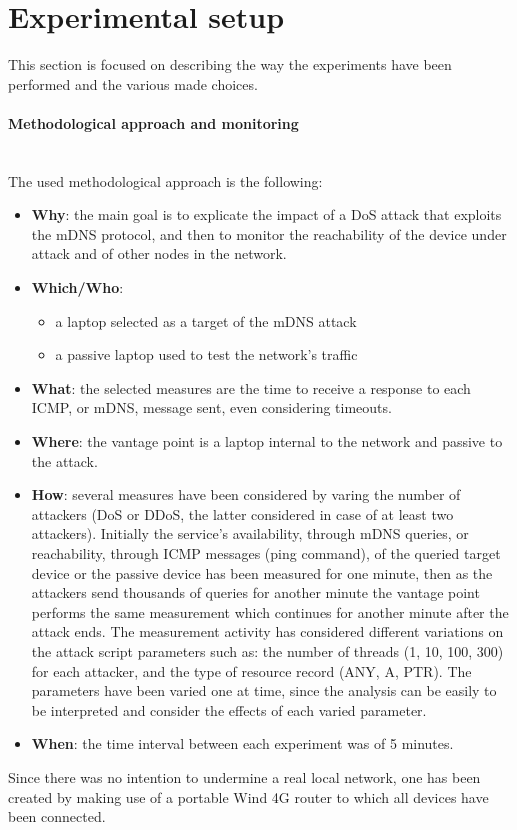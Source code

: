 \documentclass[fleqn, 11pt]{SelfArx} %
\begin{document}
\section{Experimental setup}
This section is focused on describing the way the experiments have been performed and the various made choices.

\paragraph{Methodological approach and monitoring}\mbox{}\\
The used methodological approach is the following:
\begin{itemize}[leftmargin=*]
	\item \textbf{Why}: the main goal is to explicate the impact of a DoS attack that exploits the mDNS protocol, and then to monitor the reachability of the device under attack and of other nodes in the network.
	\item \textbf{Which/Who}:
\begin{itemize}[leftmargin=*, noitemsep, topsep=0pt]
    \item a laptop selected as a target of the mDNS attack
    \item a passive laptop used to test the network's traffic
\end{itemize}
	\item \textbf{What}: the selected measures are the time to receive a response to each ICMP, or mDNS, message sent, even considering timeouts.
	\item \textbf{Where}: the vantage point is a laptop internal to the network and passive to the attack.
	\item \textbf{How}: several measures have been considered by varing the number of attackers (DoS or DDoS, the latter considered in case of at least two attackers). Initially the service's availability, through mDNS queries, or reachability, through ICMP messages (ping command), of the queried target device or the passive device has been measured for one minute, then as the attackers send thousands of queries for another minute the vantage point performs the same measurement which continues for another minute after the attack ends. \newline
The measurement activity has considered different variations on the attack script parameters such as: the number of threads (1, 10, 100, 300) for each attacker, and the type of resource record (ANY, A, PTR). The parameters have been varied one at time, since the analysis can be easily to be interpreted and consider the effects of each varied parameter.
\item \textbf{When}: the time interval between each experiment was of 5 minutes.
\end{itemize}
Since there was no intention to undermine a real local network, one has been created by making use of a portable Wind 4G router \cite{RouterSpecs} to which all devices have been connected.
\end{document}
